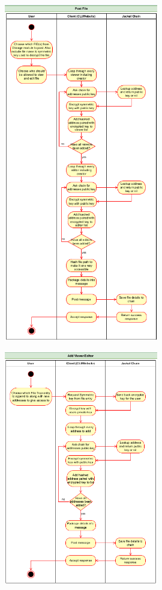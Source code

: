 \documentclass[a4paper]{article}
\begin{document}
\begin{figure}[!htbp]
\centering
\includegraphics[width=0.6\textwidth]{assets/filetree3.png}
\caption{}
\end{figure}

\begin{figure}[!htbp]
\centering
\includegraphics[width=0.6\textwidth]{assets/filetree4.png}
\caption{}
\end{figure}
\end{document}
